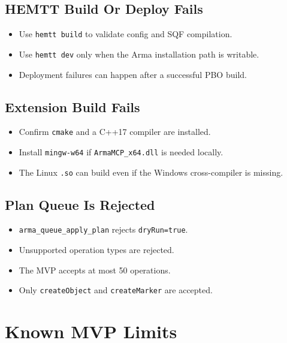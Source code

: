 \documentclass[11pt]{article}
\newcommand{\code}[1]{\texttt{#1}}
\begin{document}
\subsection{HEMTT Build Or Deploy Fails}

\begin{itemize}
  \item Use \code{hemtt build} to validate config and SQF compilation.
  \item Use \code{hemtt dev} only when the Arma installation path is writable.
  \item Deployment failures can happen after a successful PBO build.
\end{itemize}

\subsection{Extension Build Fails}

\begin{itemize}
  \item Confirm \code{cmake} and a C++17 compiler are installed.
  \item Install \code{mingw-w64} if \code{ArmaMCP\_x64.dll} is needed locally.
  \item The Linux \code{.so} can build even if the Windows cross-compiler is missing.
\end{itemize}

\subsection{Plan Queue Is Rejected}

\begin{itemize}
  \item \code{arma\_queue\_apply\_plan} rejects \code{dryRun=true}.
  \item Unsupported operation types are rejected.
  \item The MVP accepts at most 50 operations.
  \item Only \code{createObject} and \code{createMarker} are accepted.
\end{itemize}

\section{Known MVP Limits}
\end{document}
